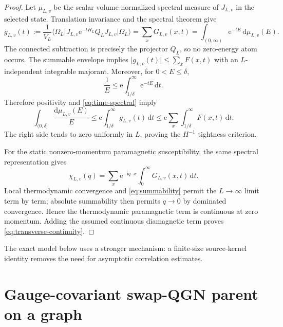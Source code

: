 \documentclass[11pt]{article}
\theoremstyle{definition}
\theoremstyle{remark}
\newcommand{\dd}{\mathrm d}
\newcommand{\I}{\mathrm i}
\newcommand{\e}{\mathrm e}
\newcommand{\ket}[1]{\lvert #1\rangle}
\newcommand{\bra}[1]{\langle #1\rvert}
\newcommand{\abs}[1]{\lvert #1\rvert}
\begin{document}
\begin{proof}
Let $\mu_{L,v}$ be the scalar volume-normalized spectral measure of $J_{L,v}$ in the selected state.
Translation invariance and the spectral theorem give
\begin{equation}
 g_{L,v}(t)
 :=\frac1{V_L}\bra{\Omega_L}J_{L,v}\e^{-t\widehat H_L}Q_LJ_{L,v}\ket{\Omega_L}
 =\sum_xG_{L,v}(x,t)
 =\int_{(0,\infty)}\e^{-tE}\,\dd\mu_{L,v}(E).
 \label{eq:time-spectral}
\end{equation}
The connected subtraction is precisely the projector $Q_L$, so no zero-energy atom occurs.  The
summable envelope implies
$\abs{g_{L,v}(t)}\le\sum_xF(x,t)$ with an $L$-independent integrable majorant.
Moreover, for $0<E\le\delta$,
\begin{equation}
 \frac1E
 \le \mathrm e\int_{1/\delta}^{\infty}\e^{-tE}\,\dd t.
\end{equation}
Therefore positivity and \eqref{eq:time-spectral} imply
\begin{equation}
 \int_{(0,\delta]}\frac{\dd\mu_{L,v}(E)}E
 \le \mathrm e\int_{1/\delta}^{\infty}g_{L,v}(t)\,\dd t
 \le \mathrm e\sum_x\int_{1/\delta}^{\infty}F(x,t)\,\dd t.
 \label{eq:summability-tail}
\end{equation}
The right side tends to zero uniformly in $L$, proving the $H^{-1}$ tightness criterion.

For the static nonzero-momentum paramagnetic susceptibility, the same spectral representation gives
\begin{equation}
 \chi_{L,v}(q)
 =\sum_x\e^{-\I q\cdot x}\int_0^\infty G_{L,v}(x,t)\,\dd t.
 \label{eq:Fourier-susceptibility}
\end{equation}
Local thermodynamic convergence and \eqref{eq:summability} permit the $L\to\infty$ limit term by term;
absolute summability then permits $q\to0$ by dominated convergence.  Hence the thermodynamic
paramagnetic term is continuous at zero momentum.  Adding the assumed continuous diamagnetic term
proves \eqref{eq:transverse-continuity}.
\end{proof}

The exact model below uses a stronger mechanism: a finite-size source-kernel identity removes the need
for asymptotic correlation estimates.

\section{Gauge-covariant swap-QGN parent on a graph}
\label{sec:graph-model}
\end{document}
